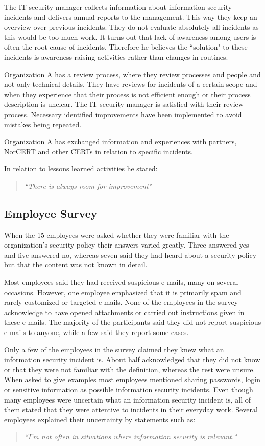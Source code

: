 The IT security manager collects information about information security incidents and delivers annual reports to the management. This way they keep an overview over previous incidents. They do not evaluate absolutely all incidents as this would be too much work. It turns out that lack of awareness among users is often the root cause of incidents. Therefore he believes the ``solution" to these incidents is awareness-raising activities rather than changes in routines.

Organization A has a review process, where they review processes and people and not only technical details. They have reviews for incidents of a certain scope and when they experience that their process is not efficient enough or their process description is unclear. The IT security manager is satisfied with their review process. Necessary identified improvements have been implemented to avoid mistakes being repeated.

Organization A has exchanged information and experiences with partners, \acs{NorCERT} and other \acp{CERT} in relation to specific incidents.

In relation to lessons learned activities he stated: 

\begin{quote}
\textit{``There is always room for improvement"}
\end{quote}

\subsection{Employee Survey}
When the 15 employees were asked whether they were familiar with the organization's security policy their answers varied greatly. Three answered yes and five answered no, whereas seven said they had heard about a security policy but that the content was not known in detail. 

Most employees said they had received suspicious e-mails, many on several occasions. However, one employee emphasized that it is primarily spam and rarely customized or targeted e-mails. None of the employees in the survey acknowledge to have opened attachments or carried out instructions given in these e-mails. The majority of the participants said they did not report suspicious e-mails to anyone, while a few said they report some cases.

Only a few of the employees in the survey claimed they knew what an information security incident is. About half acknowledged that they did not know or that they were not familiar with the definition, whereas the rest were unsure. When asked to give examples most employees mentioned sharing passwords, login or sensitive information as possible information security incidents. Even though many employees were uncertain what an information security incident is, all of them stated that they were attentive to incidents in their everyday work. 
Several employees explained their uncertainty by statements such as:
\begin{quote}
\textit{``I'm not often in situations where information security is relevant."}
\end{quote}


